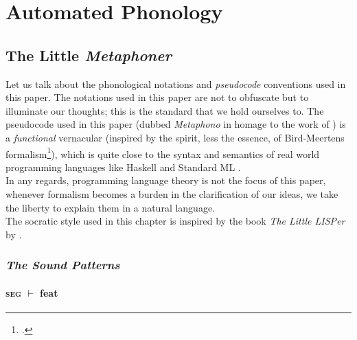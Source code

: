 \documentclass{report}[12pt]
\begin{document}
\part*{Automated Phonology}

\chapter{The Little \emph{Metaphoner}}

Let us talk about the phonological notations and \emph{pseudocode} conventions used in this paper. The notations used in this paper are not to obfuscate but to illuminate our thoughts; this is the standard that we hold ourselves to. The pseudocode used in this paper (dubbed \emph{Metaphono} in homage to the work of \cite{hartman_phono}) is a \emph{functional} vernacular (inspired by the spirit, less the essence, of Bird-Meertens formalism\footcite{bird_moor, squiggol}), which is quite close to the syntax and semantics of real world programming languages like Haskell \parencite{haskell2010} and Standard ML \parencite{def_sml}. \\
In any regards, programming language theory is not the focus of this paper, whenever formalism becomes a burden in the clarification of our ideas, we take the liberty to explain them in a natural language. \\
The socratic style used in this chapter is inspired by the book \emph{The Little LISPer} by \cite{lisper}.

\section{\emph{The Sound Patterns}}

\subsection*{\textsc{seg} $\vdash$ feat}
\end{document}
